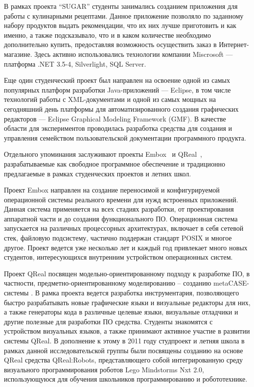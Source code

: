 \documentclass[a5paper]{article}
\begin{document}
В рамках проекта ``SUGAR'' студенты занимались созданием приложения для работы с кулинарными рецептами. Данное приложение позволяло по заданному набору продуктов выдать рекомендации, что их них лучше приготовить и как именно, а также подсказывало, что и в каком количестве необходимо дополнительно купить, предоставляя возможность осуществить заказ в Интернет-магазине. Здесь активно использовались технологии компании Miscrosoft — платформа .NET 3.5-4, Silverlight, SQL Server.

Еще один студенческий проект был направлен на освоение одной из самых популярных платформ разработки Java-приложений — Eclipse, в том числе технологий работы с XML-документами и одной из самых мощных на сегодняшний день платформы для автоматизированного создания графических редакторов — Eclipse Graphical Modeling Framework (GMF). В качестве области для экспериментов проводилась разработка средства для создания и управления семейством пользовательской документации программного продукта. 
 
Отдельного упоминания заслуживают проекты Embox~\cite{embox} и QReal~\cite{qreal}, разрабатываемые как свободное программное обеспечение и традиционно предлагаемые в рамках студенческих проектов и летних школ. 

Проект Embox направлен на создание переносимой  и конфигурируемой операционной системы реального времени для нужд встроенных приложений. Данная система применяется на всех стадиях разработки, от проектирования аппаратной части и до создания функционального ПО. Операционная система  запускается на различных процессорных архитектурах, включает в себя сетевой стек, файловую подсистему, частично поддержан стандарт POSIX и многое другое. Проект ведется уже несколько лет и каждый год привлекает много новых студентов, интересующихся внутренним устройством операционных систем.  

Проект QReal посвящен модельно-ориентированному подходу к разработке ПО, в частности, предметно-ориентированному моделированию – созданию metaCASE-системы . В рамка проекта ведется разработка инструментария, позволяющего быстро разрабатывать новые графические языки и визуальные редакторы для них, а также генераторы кода в различные целевые языки, визуальные отладчики и другие полезные для разработки ПО средства. Студенты знакомятся с устройством визуальных языков, а также принимают активное участие в развитии системы QReal. В дополнение к этому в 2011 году студпроект и летняя школа в рамках данной исследовательской группы были посвящены созданию на основе QReal средства QReal:Robots, представляющего собой интегрированную среду визуального программирования роботов Lego Mindstorms Nxt 2.0, использующуюся для обучения школьников программированию и робототехнике.
\end{document}
